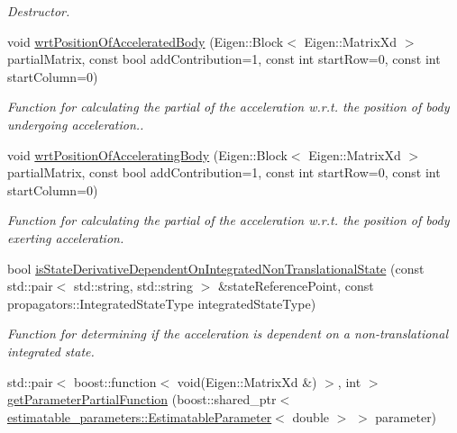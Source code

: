 \begin{DoxyCompactItemize}
\begin{DoxyCompactList}\small\item\em Destructor. \end{DoxyCompactList}\item 
void \hyperlink{classtudat_1_1acceleration__partials_1_1SphericalHarmonicsGravityPartial_a572e602e9a2469577bb7a6e51f04136b}{wrt\+Position\+Of\+Accelerated\+Body} (Eigen\+::\+Block$<$ Eigen\+::\+Matrix\+Xd $>$ partial\+Matrix, const bool add\+Contribution=1, const int start\+Row=0, const int start\+Column=0)
\begin{DoxyCompactList}\small\item\em Function for calculating the partial of the acceleration w.\+r.\+t. the position of body undergoing acceleration.. \end{DoxyCompactList}\item 
void \hyperlink{classtudat_1_1acceleration__partials_1_1SphericalHarmonicsGravityPartial_a21f310f69efdfbdc36c1fc72ca8168fa}{wrt\+Position\+Of\+Accelerating\+Body} (Eigen\+::\+Block$<$ Eigen\+::\+Matrix\+Xd $>$ partial\+Matrix, const bool add\+Contribution=1, const int start\+Row=0, const int start\+Column=0)
\begin{DoxyCompactList}\small\item\em Function for calculating the partial of the acceleration w.\+r.\+t. the position of body exerting acceleration. \end{DoxyCompactList}\item 
bool \hyperlink{classtudat_1_1acceleration__partials_1_1SphericalHarmonicsGravityPartial_aa5ca185ede62cdde73d250b44a3da219}{is\+State\+Derivative\+Dependent\+On\+Integrated\+Non\+Translational\+State} (const std\+::pair$<$ std\+::string, std\+::string $>$ \&state\+Reference\+Point, const propagators\+::\+Integrated\+State\+Type integrated\+State\+Type)
\begin{DoxyCompactList}\small\item\em Function for determining if the acceleration is dependent on a non-\/translational integrated state. \end{DoxyCompactList}\item 
std\+::pair$<$ boost\+::function$<$ void(Eigen\+::\+Matrix\+Xd \&) $>$, int $>$ \hyperlink{classtudat_1_1acceleration__partials_1_1SphericalHarmonicsGravityPartial_a6733d26c23c19cc3d6a15011c11a3a37}{get\+Parameter\+Partial\+Function} (boost\+::shared\+\_\+ptr$<$ \hyperlink{classtudat_1_1estimatable__parameters_1_1EstimatableParameter}{estimatable\+\_\+parameters\+::\+Estimatable\+Parameter}$<$ double $>$ $>$ parameter)

\end{DoxyCompactItemize}
